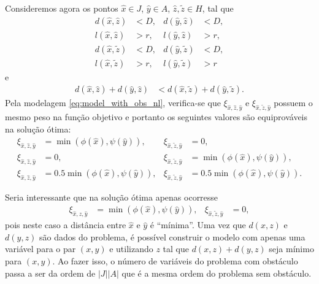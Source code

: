 Consideremos agora os pontos $\hat{x} \in J$, $\hat{y} \in A$, $\hat{z},
\tilde{z} \in H$, tal que
\begin{align*}
    d(\hat{x}, \hat{z}) &< D, & d(\hat{y}, \hat{z}) &< D, \\
    l(\hat{x}, \hat{z}) &> r, & l(\hat{y}, \hat{z}) &> r, \\
    d(\hat{x}, \tilde{z}) &< D, & d(\hat{y}, \tilde{z}) &< D, \\
    l(\hat{x}, \tilde{z}) &> r, & l(\hat{y}, \tilde{z}) &> r
\end{align*}
e
\begin{align*}
    d(\hat{x}, \hat{z}) + d(\hat{y}, \hat{z}) &< d(\hat{x}, \tilde{z}) +
    d(\hat{y}, \tilde{z}).
\end{align*}
Pela modelagem \eqref{eq:model_with_obs_nl}, verifica-se que
$\xi_{\hat{x},\hat{z},\hat{y}}$ e $\xi_{\hat{x},\tilde{z},\hat{y}}$
possuem o mesmo peso na fun\c{c}\~{a}o objetivo e portanto os seguintes valores
s\~{a}o equiprov\'{a}veis na solu\c{c}\~{a}o \'{o}tima:
\begin{align*}
    \xi_{\hat{x},\hat{z},\hat{y}} &= \min(\phi(\hat{x}), \psi(\hat{y})), &
    \xi_{\hat{x},\tilde{z},\hat{y}} &= 0, \\
    \xi_{\hat{x},\hat{z},\hat{y}} &= 0, &
    \xi_{\hat{x},\tilde{z},\hat{y}} &= \min(\phi(\hat{x}), \psi(\hat{y})), \\
    \xi_{\hat{x},\hat{z},\hat{y}} &= 0.5 \min(\phi(\hat{x}), \psi(\hat{y})), &
    \xi_{\hat{x},\tilde{z},\hat{y}} &= 0.5 \min(\phi(\hat{x}), \psi(\hat{y})).
\end{align*}

Seria interessante que na solu\c{c}\~{a}o \'{o}tima apenas ocorresse
\begin{align*}
    \xi_{\hat{x},\hat{z},\hat{y}} &= \min(\phi(\hat{x}), \psi(\hat{y})), &
    \xi_{\hat{x},\tilde{z},\hat{y}} &= 0,
\end{align*}
pois neste caso a dist\^{a}ncia entre $\hat{x}$ e $\hat{y}$ \'{e}
``m\'{i}nima''. Uma vez que $d(x, z)$ e $d(y, z)$ s\~{a}o dados do problema, \'{e}
poss\'{i}vel construir o modelo com apenas uma vari\'{a}vel para o par
$(x, y)$ e utilizando $z$ tal que $d(x, z) + d(y, z)$ seja m\'{i}nimo para $(x,
y)$. Ao fazer isso, o n\'{u}mero de vari\'{a}veis do problema com obst\'{a}culo
passa a ser da ordem de $|J| |A|$ que \'{e} a mesma ordem do problema sem
obst\'{a}culo.

